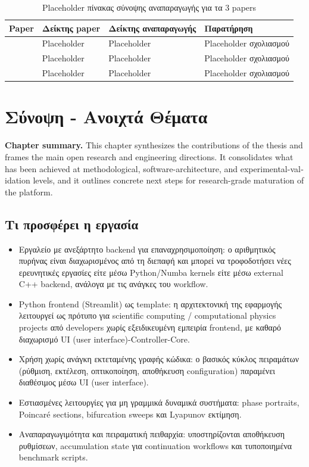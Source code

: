 \documentclass[11pt,a4paper]{report}
\begin{document}
\begin{table}[H]
\centering
\caption{Placeholder πίνακας σύνοψης αναπαραγωγής για τα 3 papers}
\label{tab:ch3-reproduction-summary}
\renewcommand{\arraystretch}{1.2}
\begin{tabular}{|l|l|l|p{}|}
\hline
\textbf{Paper} & \textbf{Δείκτης paper} & \textbf{Δείκτης αναπαραγωγής} & \textbf{Παρατήρηση} \\
\hline
\cite{pham2014_no_equilibrium} & Placeholder & Placeholder & Placeholder σχολιασμού \\
\hline
\cite{pham2017_rounded_square} & Placeholder & Placeholder & Placeholder σχολιασμού \\
\hline
\cite{pham2016_hyperjerk_memristive} & Placeholder & Placeholder & Placeholder σχολιασμού \\
\hline
\end{tabular}
\end{table}

\chapter{Σύνοψη - Ανοιχτά Θέματα}
\label{ch:summary-open-topics}

\noindent\textbf{Chapter summary.}
\textenglish{This chapter synthesizes the contributions of the thesis and frames the main open research and engineering directions. It consolidates what has been achieved at methodological, software-architecture, and experimental-validation levels, and it outlines concrete next steps for research-grade maturation of the platform.}

\section{Τι προσφέρει η εργασία}

\begin{itemize}
\item Εργαλείο με ανεξάρτητο backend για επαναχρησιμοποίηση: ο αριθμητικός πυρήνας είναι διαχωρισμένος από τη διεπαφή και μπορεί να τροφοδοτήσει νέες ερευνητικές εργασίες είτε μέσω Python/Numba kernels είτε μέσω external C++ backend, ανάλογα με τις ανάγκες του workflow.
\item Python frontend (Streamlit) ως template: η αρχιτεκτονική της εφαρμογής λειτουργεί ως πρότυπο για scientific computing / computational physics projects από developers χωρίς εξειδικευμένη εμπειρία frontend, με καθαρό διαχωρισμό UI (user interface)-Controller-Core.
\item Χρήση χωρίς ανάγκη εκτεταμένης γραφής κώδικα: ο βασικός κύκλος πειραμάτων (ρύθμιση, εκτέλεση, οπτικοποίηση, αποθήκευση configuration) παραμένει διαθέσιμος μέσω UI (user interface).
\item Εστιασμένες λειτουργίες για μη γραμμικά δυναμικά συστήματα: phase portraits, Poincar\'e sections, bifurcation sweeps και Lyapunov εκτίμηση.
\item Αναπαραγωγιμότητα και πειραματική πειθαρχία: υποστηρίζονται αποθήκευση ρυθμίσεων, accumulation state για continuation workflows και τυποποιημένα benchmark scripts.
\end{itemize}
\end{document}
